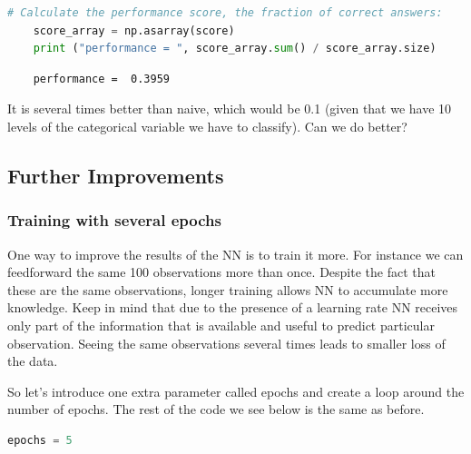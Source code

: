 \begin{lstlisting}[language=Python]   
    # Calculate the performance score, the fraction of correct answers:
    score_array = np.asarray(score)
    print ("performance = ", score_array.sum() / score_array.size)
    \end{lstlisting}

\begin{lstlisting}
    performance =  0.3959
\end{lstlisting}

  It is several times better than naive, which would be 0.1 (given that we have 10 levels of the categorical variable we have to classify). Can we do better?
  
\subsection{Further Improvements}

\subsubsection{Training with several epochs}
   
One way to improve the results of the NN is to train it more. For instance we can feedforward the same 100 observations more than once. Despite the fact that these are the same observations, longer training allows NN to accumulate more knowledge. Keep in mind that due to the presence of a learning rate NN receives only part of the information that is available and useful to predict particular observation. Seeing the same observations several times leads to smaller loss of the data.
   
So let's introduce one extra parameter called epochs and create a loop around the number of epochs. The rest of the code we see below is the same as before.
   
\begin{lstlisting}[language=Python]   
    epochs = 5
\end{lstlisting}

